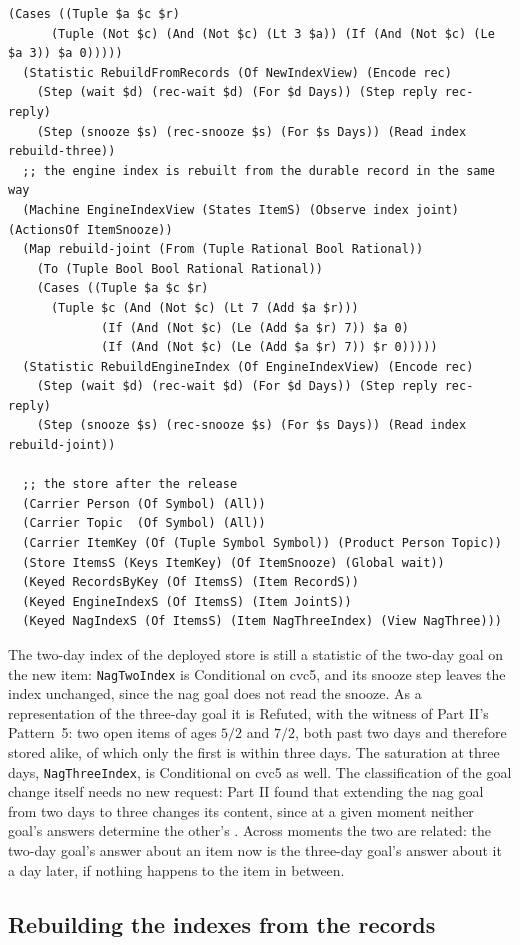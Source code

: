 \documentclass[11pt]{article}
\newcommand{\code}[1]{\texttt{#1}}
\theoremstyle{definition}
\theoremstyle{plain}
\begin{document}
\begin{lstlisting}[style=mettamod]
    (Cases ((Tuple $a $c $r)
      (Tuple (Not $c) (And (Not $c) (Lt 3 $a)) (If (And (Not $c) (Le $a 3)) $a 0)))))
  (Statistic RebuildFromRecords (Of NewIndexView) (Encode rec)
    (Step (wait $d) (rec-wait $d) (For $d Days)) (Step reply rec-reply)
    (Step (snooze $s) (rec-snooze $s) (For $s Days)) (Read index rebuild-three))
  ;; the engine index is rebuilt from the durable record in the same way
  (Machine EngineIndexView (States ItemS) (Observe index joint) (ActionsOf ItemSnooze))
  (Map rebuild-joint (From (Tuple Rational Bool Rational))
    (To (Tuple Bool Bool Rational Rational))
    (Cases ((Tuple $a $c $r)
      (Tuple $c (And (Not $c) (Lt 7 (Add $a $r)))
             (If (And (Not $c) (Le (Add $a $r) 7)) $a 0)
             (If (And (Not $c) (Le (Add $a $r) 7)) $r 0)))))
  (Statistic RebuildEngineIndex (Of EngineIndexView) (Encode rec)
    (Step (wait $d) (rec-wait $d) (For $d Days)) (Step reply rec-reply)
    (Step (snooze $s) (rec-snooze $s) (For $s Days)) (Read index rebuild-joint))

  ;; the store after the release
  (Carrier Person (Of Symbol) (All))
  (Carrier Topic  (Of Symbol) (All))
  (Carrier ItemKey (Of (Tuple Symbol Symbol)) (Product Person Topic))
  (Store ItemsS (Keys ItemKey) (Of ItemSnooze) (Global wait))
  (Keyed RecordsByKey (Of ItemsS) (Item RecordS))
  (Keyed EngineIndexS (Of ItemsS) (Item JointS))
  (Keyed NagIndexS (Of ItemsS) (Item NagThreeIndex) (View NagThree)))
\end{lstlisting}

The two-day index of the deployed store is still a statistic of the two-day goal on the new item:
\code{NagTwoIndex} is Conditional on cvc5, and its snooze step leaves the index unchanged, since the nag goal
does not read the snooze. As a representation of the three-day goal it is Refuted, with the
witness of Part II's Pattern~5: two open items of ages $5/2$ and $7/2$, both past two days and
therefore stored alike, of which only the first is within three days. The saturation at three days,
\code{NagThreeIndex}, is Conditional on cvc5 as well. The classification of the goal change itself needs no new
request: Part II found that extending the nag goal from two days to three changes its content,
since at a given moment neither goal's answers determine the other's \cite[Section~6.5]{part2}.
Across moments the two are related: the two-day goal's answer about an item now is the three-day
goal's answer about it a day later, if nothing happens to the item in between.

\subsection{Rebuilding the indexes from the records}\label{sec:rebuild}
\end{document}
